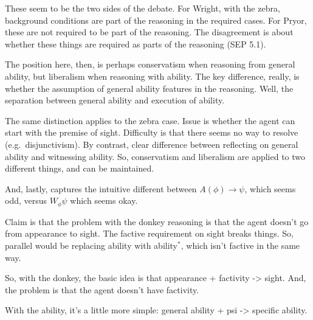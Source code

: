 \documentclass[10pt]{article}
\begin{document}
\begin{note}
  These seem to be the two sides of the debate.
  For Wright, with the zebra, background conditions are part of the reasoning in the required cases.
  For Pryor, these are not required to be part of the reasoning.
  The disagreement is about whether these things are required as parts of the reasoning (SEP 5.1).

  The position here, then, is perhaps conservatism when reasoning from general ability, but liberalism when reasoning with ability.
  The key difference, really, is whether the assumption of general ability features in the reasoning.
  Well, the separation between general ability and execution of ability.

  The same distinction applies to the zebra case.
  Issue is whether the agent can start with the premise of sight.
  Difficulty is that there seems no way to resolve (e.g.\ disjunctivism).
  By contrast, clear difference between reflecting on general ability and witnessing ability.
  So, conservatism and liberalism are applied to two different things, and can be maintained.

  And, lastly, captures the intuitive different between \(A(\phi) \rightarrow \psi\), which seems odd, versus \(W_{\phi}\psi\) which seems okay.
\end{note}

\begin{note}
  Claim is that the problem with the donkey reasoning is that the agent doesn't go from appearance to sight.
  The factive requirement on sight breaks things.
  So, parallel would be replacing ability with ability\(^{*}\), which isn't factive in the same way.

  So, with the donkey, the basic idea is that appearance + factivity -> sight.
  And, the problem is that the agent doesn't have factivity.

  With the ability, it's a little more simple: general ability + psi -> specific ability.
\end{note}
\end{document}
